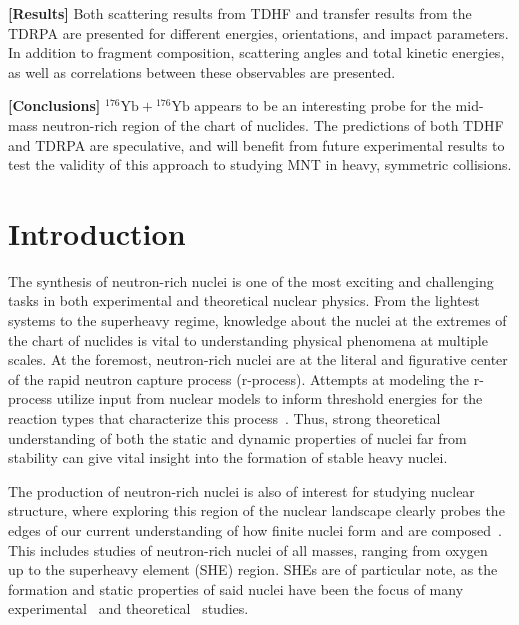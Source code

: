 		{\bf [Results]}
		Both scattering results from TDHF and transfer results from the TDRPA are presented for different energies, orientations, and impact parameters.
		In addition to fragment composition, scattering angles and total kinetic energies, as well as correlations between these observables are presented.
		
		{\bf [Conclusions]}
		$^{176}\mathrm{Yb}+{}^{176}\mathrm{Yb}$ appears to be an interesting probe for the mid-mass neutron-rich region of the chart of nuclides. The predictions of both TDHF and TDRPA are speculative, and will benefit from future experimental results to test the validity of this approach to studying MNT in heavy, symmetric collisions.


\section{Introduction}

The synthesis of neutron-rich nuclei is one of the most exciting and challenging tasks in both experimental and theoretical nuclear physics.
From the lightest systems to the superheavy regime, knowledge about the nuclei at the extremes of the chart of nuclides is vital to understanding physical phenomena at multiple scales.
At the foremost, neutron-rich nuclei are at the literal and figurative center of the rapid neutron capture process (r-process).
Attempts at modeling the r-process utilize input from nuclear models to inform threshold energies for the reaction types that characterize this process~\citep{cowan2019}.
Thus, strong theoretical understanding of both the static and dynamic properties of nuclei far from stability can give vital insight into the formation of stable heavy nuclei.

The production of neutron-rich nuclei is also of interest for studying nuclear structure, where exploring this region of the nuclear landscape clearly probes the edges of our current understanding of how finite nuclei form and are composed~\citep{otsuka2018}. %
This includes studies of neutron-rich nuclei of all masses, ranging from oxygen~\citep{desouza2013} up to the superheavy element (SHE) region.
SHEs are of particular note, as the formation and static properties of said nuclei have been the focus of many experimental~\citep{hofmann2002,munzenberg2015,morita2015,oganessian2015,roberto2015} and theoretical~\citep{bender1999,nazarewicz2002, cwiok2005,pei2009a,stone2019} studies.

